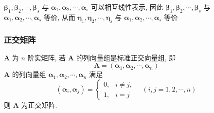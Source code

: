 \documentclass{article}
\begin{document}
					$\boldsymbol{\beta}_{1}, \boldsymbol{\beta}_{2}, \cdots, \boldsymbol{\beta}_{s}$ 与 $\boldsymbol{\alpha}_{1}, \boldsymbol{\alpha}_{2}, \cdots, \boldsymbol{\alpha}_{s}$ 可以相互线性表示, 因此 $\boldsymbol{\beta}_{1}, \boldsymbol{\beta}_{2}, \cdots, \boldsymbol{\beta}_{s}$ 与 $\boldsymbol{\alpha}_{1}, \boldsymbol{\alpha}_{2}, \cdots, \boldsymbol{\alpha}_{s}$ 等价, 从而 $\boldsymbol{\eta}_{1}, \boldsymbol{\eta}_{2}, \cdots, \boldsymbol{\eta}_{s}$ 与 $\boldsymbol{\alpha}_{1}, \boldsymbol{\alpha}_{2}, \cdots, \boldsymbol{\alpha}_{s}$ 等价
			\subsubsection{正交矩阵}
				$\boldsymbol{A}$ 为 $n$ 阶实矩阵, 若 $\boldsymbol{A}$ 的列向量组是标准正交向量组, 即
				$$
				\boldsymbol{A}=\left(\boldsymbol{\alpha}_{1}, \boldsymbol{\alpha}_{2}, \cdots, \boldsymbol{\alpha}_{n}\right)
				$$
				$\boldsymbol{A}$ 的列向量组 $\boldsymbol{\alpha}_{1}, \boldsymbol{\alpha}_{2}, \cdots, \boldsymbol{\alpha}_{n}$ 满足
				$$
				\left(\boldsymbol{\alpha}_{i}, \boldsymbol{\alpha}_{j}\right)=\left\{\begin{array}{ll}
					0, & i \neq j, \\
					1, & i=j
				\end{array} \quad(i, j=1,2, \cdots, n)\right.
				$$
				则 $\boldsymbol{A}$ 为正交矩阵.
\end{document}
